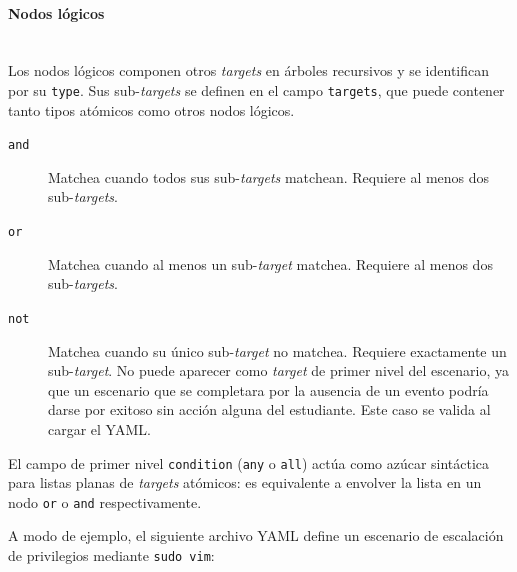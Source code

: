 \paragraph{Nodos lógicos}\mbox{}\\[1.0em]
Los nodos lógicos componen otros \textit{targets} en árboles recursivos y se
identifican por su \texttt{type}. Sus sub-\textit{targets} se definen en el
campo \texttt{targets}, que puede contener tanto tipos atómicos como otros nodos
lógicos.

\begin{description}
    \item[\texttt{and}] Matchea cuando todos sus sub-\textit{targets} matchean.
    Requiere al menos dos sub-\textit{targets}.

    \item[\texttt{or}] Matchea cuando al menos un sub-\textit{target} matchea.
    Requiere al menos dos sub-\textit{targets}.

    \item[\texttt{not}] Matchea cuando su único sub-\textit{target} no matchea.
    Requiere exactamente un sub-\textit{target}. No puede aparecer como
    \textit{target} de primer nivel del escenario, ya que un escenario que se
    completara por la ausencia de un evento podría darse por exitoso sin acción
    alguna del estudiante. Este caso se valida al cargar el YAML.
\end{description}

El campo de primer nivel \texttt{condition} (\texttt{any} o \texttt{all}) actúa
como azúcar sintáctica para listas planas de \textit{targets} atómicos: es
equivalente a envolver la lista en un nodo \texttt{or} o \texttt{and}
respectivamente.

A modo de ejemplo, el siguiente archivo YAML define un escenario de escalación
de privilegios mediante \texttt{sudo vim}:

